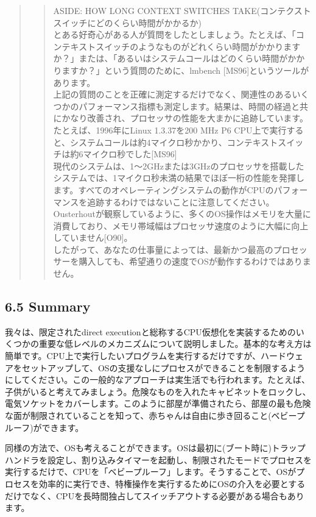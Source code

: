 \begin{quote}
\begin{quote}
ASIDE: HOW LONG CONTEXT SWITCHES
TAKE(コンテクストスイッチにどのくらい時間がかかるか)\\
とある好奇心がある人が質問をしたとしましょう。たとえば、「コンテキストスイッチのようなものがどれくらい時間がかかりますか？」または、「あるいはシステムコールはどのくらい時間がかかりますか？」という質問のために、lmbench
{[}MS96{]}というツールがあります。\\
上記の質問のことを正確に測定するだけでなく、関連性のあるいくつかのパフォーマンス指標も測定します。結果は、時間の経過と共にかなり改善され、プロセッサの性能を大まかに追跡しています。たとえば、1996年にLinux
1.3.37を200 MHz P6
CPU上で実行すると、システムコールは約4マイクロ秒かかり、コンテキストスイッチは約6マイクロ秒でした{[}MS96{]}\\
現代のシステムは、1〜2GHzまたは3GHzのプロセッサを搭載したシステムでは、1マイクロ秒未満の結果でほぼ一桁の性能を発揮します。すべてのオペレーティングシステムの動作がCPUのパフォーマンスを追跡するわけではないことに注意してください。Ousterhoutが観察しているように、多くのOS操作はメモリを大量に消費しており、メモリ帯域幅はプロセッサ速度のように大幅に向上していません{[}O90{]}。\\
したがって、あなたの仕事量によっては、最新かつ最高のプロセッサーを購入しても、希望通りの速度でOSが動作するわけではありません。
\end{quote}
\end{quote}

\hypertarget{summary-1}{%
\subsection*{6.5 Summary}\label{summary-1}}

我々は、限定されたdirect
executionと総称するCPU仮想化を実装するためのいくつかの重要な低レベルのメカニズムについて説明しました。基本的な考え方は簡単です。CPU上で実行したいプログラムを実行するだけですが、ハードウェアをセットアップして、OSの支援なしにプロセスができることを制限するようにしてください。この一般的なアプローチは実生活でも行われます。たとえば、子供がいると考えてみましょう。危険なものを入れたキャビネットをロックし、電気ソケットをカバーします。このように部屋が準備されたら、部屋の最も危険な面が制限されていることを知って、赤ちゃんは自由に歩き回ること(ベビープルーフ)ができます。

同様の方法で、OSも考えることができます。OSは最初に(ブート時に)トラップハンドラを設定し、割り込みタイマーを起動し、制限されたモードでプロセスを実行するだけで、CPUを「ベビープルーフ」します。そうすることで、OSがプロセスを効率的に実行でき、特権操作を実行するためにOSの介入を必要とするだけでなく、CPUを長時間独占してスイッチアウトする必要がある場合もあります。


